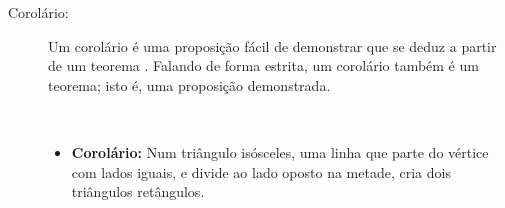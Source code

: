 \begin{description}
\item[Corolário:]  Um corolário é uma proposição 
fácil de demonstrar que se deduz a partir de um teorema \cite[pp. 49]{fossa2009introducao} \cite[pp. 41]{solow1987como}.
Falando de forma estrita, um corolário também é um teorema; isto é, uma proposição demonstrada.
\begin{example}~\\
\begin{itemize}
\item \textbf{Corolário:} Num triângulo isósceles, 
uma linha que parte do vértice com lados iguais, e divide ao lado oposto na metade,
cria dois triângulos retângulos.
\end{itemize}
\end{example}

\end{description}
